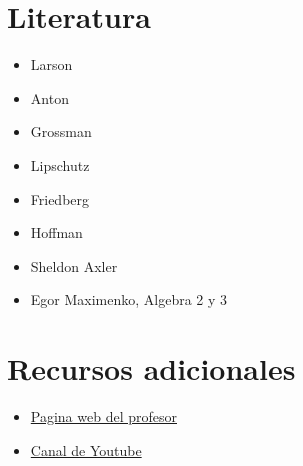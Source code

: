 \documentclass{IEEEtran}
\begin{document}
\section*{Literatura}
\begin{itemize}
	\item Larson
	\item Anton
	\item Grossman
	\item Lipschutz
	\item Friedberg
	\item Hoffman
	\item Sheldon Axler
	\item Egor Maximenko, Algebra 2 y 3
\end{itemize}
\section*{Recursos adicionales}
\begin{itemize}
\item\href{jgwalneko.github.io}{Pagina web del profesor }
\item\href{youtube.com/@jg_walneko}{Canal de Youtube }
\end{itemize}
\end{document}
